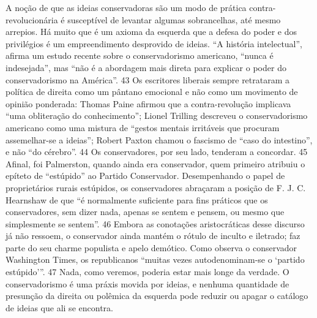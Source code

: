 A noção de que as ideias conservadoras são um modo de prática contra-revolucionária é susceptível de levantar algumas sobrancelhas, até mesmo arrepios. Há muito que é um axioma da esquerda que a defesa do poder e dos privilégios é um empreendimento desprovido de ideias. “A história intelectual”, afirma um estudo recente sobre o conservadorismo americano, “nunca é indesejada”, mas “não é a abordagem mais direta para explicar o poder do conservadorismo na América”. {\color{blue}43} Os escritores liberais sempre retrataram a política de direita como um pântano emocional e não como um movimento de opinião ponderada: Thomas Paine afirmou que a contra-revolução implicava “uma obliteração do conhecimento”; Lionel Trilling descreveu o conservadorismo americano como uma mistura de “gestos mentais irritáveis ​​que procuram assemelhar-se a ideias”; Robert Paxton chamou o fascismo de “caso do intestino”, e não “do cérebro”. {\color{blue}44} Os conservadores, por seu lado, tenderam a concordar. {\color{blue}45} Afinal, foi Palmerston, quando ainda era conservador, quem primeiro atribuiu o epíteto de “estúpido” ao Partido Conservador. Desempenhando o papel de proprietários rurais estúpidos, os conservadores abraçaram a posição de F. J. C. Hearnshaw de que “é normalmente suficiente para fins práticos que os conservadores, sem dizer nada, apenas se sentem e pensem, ou mesmo que simplesmente se sentem”. {\color{blue}46} Embora as conotações aristocráticas desse discurso já não ressoem, o conservador ainda mantém o rótulo de inculto e iletrado; faz parte do seu charme populista e apelo demótico. Como observa o conservador Washington Times, os republicanos “muitas vezes autodenominam-se o ‘partido estúpido’”. {\color{blue}47} Nada, como veremos, poderia estar mais longe da verdade. O conservadorismo é uma práxis movida por ideias, e nenhuma quantidade de presunção da direita ou polêmica da esquerda pode reduzir ou apagar o catálogo de ideias que ali se encontra.
 \par 
